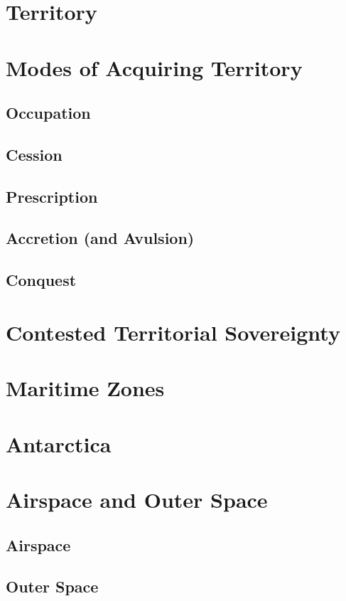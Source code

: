 \section{Territory}

\section{Modes of Acquiring Territory}

\subsection{Occupation}

\subsection{Cession}

\subsection{Prescription}

\subsection{Accretion (and Avulsion)}

\subsection{Conquest}

\section{Contested Territorial Sovereignty}

\section{Maritime Zones}

\section{Antarctica}

\section{Airspace and Outer Space}

\subsection{Airspace}

\subsection{Outer Space}